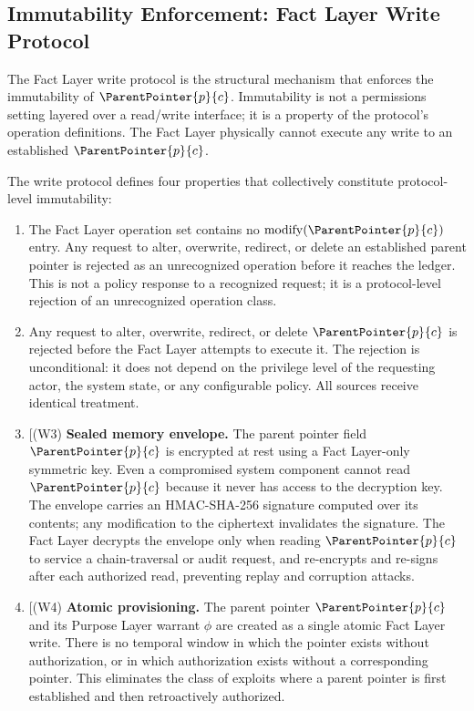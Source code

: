 \subsection{Immutability Enforcement: Fact Layer Write Protocol}
\label{sec:fact-layer-enforcement}

The Fact Layer write protocol is the structural mechanism that enforces the immutability of $\ParentPointer{p}{c}$. Immutability is not a permissions setting layered over a read/write interface; it is a property of the protocol's operation definitions. The Fact Layer physically cannot execute any write to an established $\ParentPointer{p}{c}$.

The write protocol defines four properties that collectively constitute protocol-level immutability:

\begin{enumerate}
    \item[(W1) \textbf{No modification operation defined.}] The Fact Layer operation set contains no $\mathrm{modify}(\ParentPointer{p}{c})$ entry. Any request to alter, overwrite, redirect, or delete an established parent pointer is rejected as an unrecognized operation before it reaches the ledger. This is not a policy response to a recognized request; it is a protocol-level rejection of an unrecognized operation class.

    \item[(W2) \textbf{All modification requests are rejected at the protocol level.}] Any request to alter, overwrite, redirect, or delete $\ParentPointer{p}{c}$ is rejected before the Fact Layer attempts to execute it. The rejection is unconditional: it does not depend on the privilege level of the requesting actor, the system state, or any configurable policy. All sources receive identical treatment.

    \item[(W3) \textbf{Sealed memory envelope.} The parent pointer field $\ParentPointer{p}{c}$ is encrypted at rest using a Fact Layer-only symmetric key. Even a compromised system component cannot read $\ParentPointer{p}{c}$ because it never has access to the decryption key. The envelope carries an HMAC-SHA-256 signature computed over its contents; any modification to the ciphertext invalidates the signature. The Fact Layer decrypts the envelope only when reading $\ParentPointer{p}{c}$ to service a chain-traversal or audit request, and re-encrypts and re-signs after each authorized read, preventing replay and corruption attacks.

    \item[(W4) \textbf{Atomic provisioning.} The parent pointer $\ParentPointer{p}{c}$ and its Purpose Layer warrant $\phi$ are created as a single atomic Fact Layer write. There is no temporal window in which the pointer exists without authorization, or in which authorization exists without a corresponding pointer. This eliminates the class of exploits where a parent pointer is first established and then retroactively authorized.
\end{enumerate}

